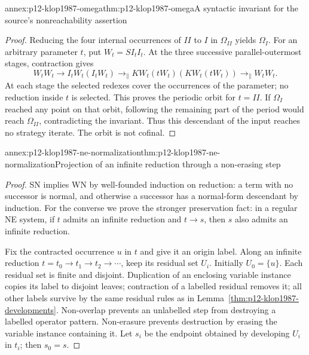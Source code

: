 \begin{annexitem}{annex:p12-klop1987-omega}{thm:p12-klop1987-omega}{A syntactic invariant for the source's nonreachability assertion}
\begin{proof}
Reducing the four internal occurrences of \(II\) to \(I\)
in \(\Omega_{II}\) yields \(\Omega_I\). For an arbitrary
parameter \(t\), put \(W_t=SI_tI_t\). At the three successive
parallel-outermost stages, contraction gives
\[
 W_tW_t\to I_tW_t(I_tW_t)
 \to_{\parallel}KW_t(tW_t)(KW_t(tW_t))
 \to_{\parallel}W_tW_t.
\]
At each stage the selected redexes cover the occurrences of the parameter;
no reduction inside \(t\) is selected. This proves the periodic orbit
for \(t=II\). If \(\Omega_I\) reached any point on that orbit,
following the remaining part of the period would reach
\(\Omega_{II}\), contradicting the invariant. Thus this descendant
of the input reaches no strategy iterate. The orbit is not cofinal.
\end{proof}
\end{annexitem}

\begin{annexitem}{annex:p12-klop1987-ne-normalization}{thm:p12-klop1987-ne-normalization}{Projection of an infinite reduction through a non-erasing step}
\begin{proof}
SN implies WN by well-founded induction on reduction: a term with no
successor is normal, and otherwise a successor has a normal-form descendant
by induction. For the converse we prove the stronger preservation fact:
in a regular NE system, if \(t\) admits an infinite reduction and
\(t\to s\), then \(s\) also admits an infinite reduction.

Fix the contracted occurrence \(u\) in \(t\) and give it an origin
label. Along an infinite reduction
\(t=t_0\to t_1\to t_2\to\cdots\), keep its residual set
\(U_i\). Initially \(U_0=\{u\}\). Each residual set is finite
and disjoint. Duplication of an enclosing variable instance copies its
label to disjoint leaves; contraction of a labelled residual removes it;
all other labels survive by the same residual rules as in
Lemma~\ref{thm:p12-klop1987-developments}. Non-overlap prevents an
unlabelled step from destroying a labelled operator pattern. Non-erasure
prevents destruction by erasing the variable instance containing it.
Let \(s_i\) be the endpoint obtained by developing \(U_i\) in
\(t_i\); then \(s_0=s\).


\end{proof}
\end{annexitem}
